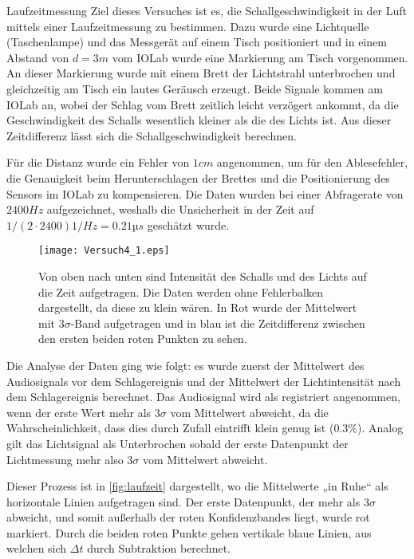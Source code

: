 \documentclass{alex_gp}
\begin{document}
\begin{mybox}{Laufzeitmessung}
	Ziel dieses Versuches ist es, die Schallgeschwindigkeit in der Luft mittels einer Laufzeitmessung zu bestimmen. Dazu wurde eine Lichtquelle (Taschenlampe) und das Messgerät auf einem Tisch positioniert und in einem Abstand von \( d = 3 \unit{m} \) vom IOLab wurde eine Markierung am Tisch vorgenommen. An dieser Markierung wurde mit einem Brett der Lichtstrahl unterbrochen und gleichzeitig am Tisch ein lautes Geräusch erzeugt. Beide Signale kommen am IOLab an, wobei der Schlag vom Brett zeitlich leicht verzögert ankommt, da die Geschwindigkeit des Schalls wesentlich kleiner als die des Lichts ist. Aus dieser Zeitdifferenz lässt sich die Schallgeschwindigkeit berechnen. 
	
	Für die Distanz wurde ein Fehler von \( 1 \unit{cm} \) angenommen, um für den Ablesefehler, die Genauigkeit beim Herunterschlagen der Brettes und die Positionierung des Sensors im IOLab zu kompensieren. Die Daten wurden bei einer Abfragerate von \( 2400 \unit{Hz} \) aufgezeichnet, weshalb die Unsicherheit in der Zeit auf \( 1/(2\cdot2400) \unit{1/Hz} = 0.21 \unit{µs} \) geschätzt wurde.
	
	\begin{figure}[H]	
		\centering
		\texttt{[image: Versuch4\_1.eps]}
		\caption{Von oben nach unten sind Intensität des Schalls und des Lichts auf die Zeit aufgetragen. Die Daten werden ohne Fehlerbalken dargestellt, da diese zu klein wären. In Rot wurde der Mittelwert mit \( 3\sigma \)-Band aufgetragen und in blau ist die Zeitdifferenz zwischen den ersten beiden roten Punkten zu sehen.}
		\label{fig:laufzeit}
	\end{figure}

	Die Analyse der Daten ging wie folgt: es wurde zuerst der Mittelwert des Audiosignals vor dem Schlagereignis und der Mittelwert der Lichtintensität nach dem Schlagereignis berechnet. Das Audiosignal wird als registriert angenommen, wenn der erste Wert mehr als \( 3\sigma \) vom Mittelwert abweicht, da die Wahrscheinlichkeit, dass dies durch Zufall eintrifft klein genug ist (\( 0.3 \% \)). Analog gilt das Lichtsignal als Unterbrochen sobald der erste Datenpunkt der Lichtmessung mehr also \( 3\sigma \) vom Mittelwert abweicht. 
	
	Dieser Prozess ist in \autoref{fig:laufzeit} dargestellt, wo die Mittelwerte „in Ruhe“ als horizontale Linien aufgetragen sind. Der erste Datenpunkt, der mehr als \( 3\sigma \) abweicht, und somit außerhalb der roten Konfidenzbandes liegt, wurde rot markiert. Durch die beiden roten Punkte gehen vertikale blaue Linien, aus welchen sich \( \Delta t \) durch Subtraktion berechnet.


\end{mybox}
\end{document}
